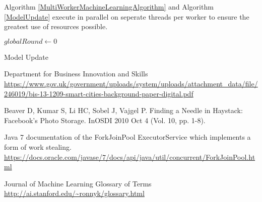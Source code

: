 \documentclass[12pt]{article}
\begin{document}
\medskip
\medskip

Algorithm \ref{MultiWorkerMachineLearningAlgorithm} and Algorithm \ref{ModelUpdate} execute in parallel on seperate threads per worker to ensure the greatest use of resources possible.
\newline

\IncMargin{1em}
\begin{algorithm}[H]
  $globalRound \longleftarrow 0$\;
 \caption{Model Update}
 \label{ModelUpdate}
\end{algorithm}
\DecMargin{1em}
\medskip

\newpage

\begin{thebibliography}{9}

Department for Business Innovation and Skills
\\\url{https://www.gov.uk/government/uploads/system/uploads/attachment_data/file/246019/bis-13-1209-smart-cities-background-paper-digital.pdf}

Beaver D, Kumar S, Li HC, Sobel J, Vajgel P. Finding a Needle in Haystack: Facebook's Photo Storage. InOSDI 2010 Oct 4 (Vol. 10, pp. 1-8).

Java 7 documentation of the ForkJoinPool ExecutorService which implements a form of work stealing.
\\\url{https://docs.oracle.com/javase/7/docs/api/java/util/concurrent/ForkJoinPool.html}

Journal of Machine Learning Glossary of Terms
\\\url{http://ai.stanford.edu/~ronnyk/glossary.html}

\end{thebibliography}
\end{document}
